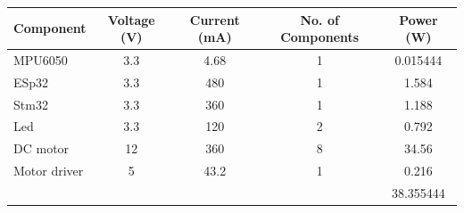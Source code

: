 \begin{table}[H]
  \begin{center}
    \leavevmode
     \begin{tabular}{| l | c | c | c | c |}\hline
Component & Voltage (V) & Current (mA) & No. of Components & Power (W) \\\hline
MPU6050 & 3.3 & 4.68 & 1 & 0.015444 \\\hline
ESp32 & 3.3 & 480 & 1 & 1.584 \\\hline
Stm32 & 3.3 & 360 & 1 & 1.188 \\\hline
Led & 3.3 & 120 & 2 & 0.792 \\\hline
DC motor & 12 & 360 & 8 & 34.56 \\\hline
Motor driver & 5 & 43.2 & 1 & 0.216 \\\hline
& & & & 38.355444 \\\hline
    \end{tabular}
    \label{table:1}
  \end{center}
\end{table}




